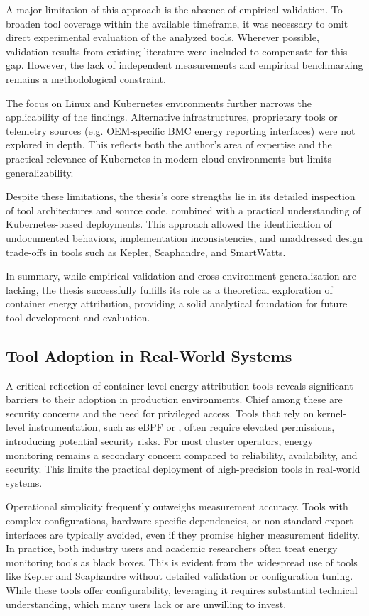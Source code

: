 A major limitation of this approach is the absence of empirical validation. To broaden tool coverage within the available timeframe, it was necessary to omit direct experimental evaluation of the analyzed tools. Wherever possible, validation results from existing literature were included to compensate for this gap. However, the lack of independent measurements and empirical benchmarking remains a methodological constraint.

The focus on Linux and Kubernetes environments further narrows the applicability of the findings. Alternative infrastructures, proprietary tools or telemetry sources (e.g. OEM-specific BMC energy reporting interfaces) were not explored in depth. This reflects both the author's area of expertise and the practical relevance of Kubernetes in modern cloud environments but limits generalizability.

Despite these limitations, the thesis’s core strengths lie in its detailed inspection of tool architectures and source code, combined with a practical understanding of Kubernetes-based deployments. This approach allowed the identification of undocumented behaviors, implementation inconsistencies, and unaddressed design trade-offs in tools such as Kepler, Scaphandre, and SmartWatts.

In summary, while empirical validation and cross-environment generalization are lacking, the thesis successfully fulfills its role as a theoretical exploration of container energy attribution, providing a solid analytical foundation for future tool development and evaluation.

\subsection{Tool Adoption in Real-World Systems}

A critical reflection of container-level energy attribution tools reveals significant barriers to their adoption in production environments. Chief among these are security concerns and the need for privileged access. Tools that rely on kernel-level instrumentation, such as eBPF or , often require elevated permissions, introducing potential security risks. For most cluster operators, energy monitoring remains a secondary concern compared to reliability, availability, and security. This limits the practical deployment of high-precision tools in real-world systems.

Operational simplicity frequently outweighs measurement accuracy. Tools with complex configurations, hardware-specific dependencies, or non-standard export interfaces are typically avoided, even if they promise higher measurement fidelity. In practice, both industry users and academic researchers often treat energy monitoring tools as black boxes. This is evident from the widespread use of tools like Kepler and Scaphandre without detailed validation or configuration tuning. While these tools offer configurability, leveraging it requires substantial technical understanding, which many users lack or are unwilling to invest.

